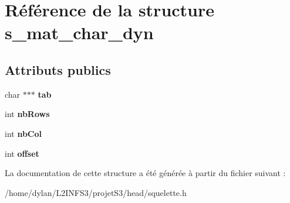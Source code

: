\hypertarget{structs__mat__char__dyn}{}\section{Référence de la structure s\+\_\+mat\+\_\+char\+\_\+dyn}
\label{structs__mat__char__dyn}
\subsection*{Attributs publics}
\begin{DoxyCompactItemize}
\item 
\mbox{\label{structs__mat__char__dyn_abd4d6f6e0cb1c98d13d723e9f98ce3f8}} 
char $\ast$$\ast$$\ast$ {\bfseries tab}
\item 
\mbox{\label{structs__mat__char__dyn_ad9f0887072dd695f4c38db51d29fe877}} 
int {\bfseries nb\+Rows}
\item 
\mbox{\label{structs__mat__char__dyn_a26a5e3dc22413338e62bcdf9c6de1c87}} 
int {\bfseries nb\+Col}
\item 
\mbox{\label{structs__mat__char__dyn_a2018301fd78ef68060d8973465ba5803}} 
int {\bfseries offset}
\end{DoxyCompactItemize}


La documentation de cette structure a été générée à partir du fichier suivant \+:\begin{DoxyCompactItemize}
\item 
/home/dylan/\+L2\+I\+N\+F\+S3/projet\+S3/head/squelette.\+h\end{DoxyCompactItemize}
